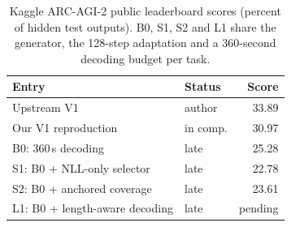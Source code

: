 \begin{table}[t]\centering\footnotesize
\caption{Kaggle ARC-AGI-2 public leaderboard scores (percent of hidden test outputs). B0, S1, S2 and L1 share the generator, the 128-step adaptation and a 360-second decoding budget per task.}\label{tab:leaderboard}
\setlength{\tabcolsep}{3pt}\begin{tabular}{llr}\toprule
Entry & Status & Score \\\midrule
Upstream V1 \citep{rudra2026} & author & 33.89 \\
Our V1 reproduction & in comp. & 30.97 \\
B0: 360\,s decoding & late & 25.28 \\
S1: B0 + NLL-only selector & late & 22.78 \\
S2: B0 + anchored coverage & late & 23.61 \\
L1: B0 + length-aware decoding & late & pending \\
\bottomrule\end{tabular}\end{table}
